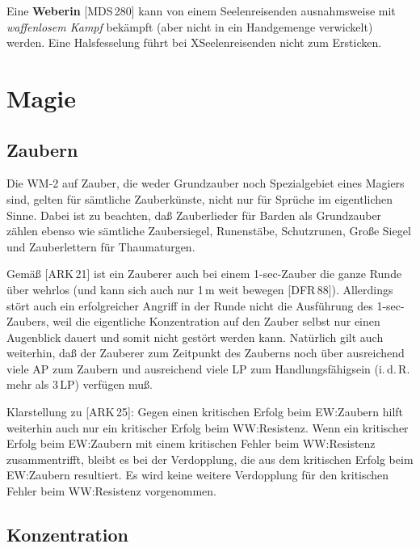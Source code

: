 \documentclass[10pt,a4paper,germanpar]{article}
\begin{document}
Eine \textbf{Weberin} [MDS\,280] kann von einem Seelenreisenden
ausnahmsweise mit \emph{waffenlosem Kampf} bekämpft (aber nicht
in ein Handgemenge verwickelt) werden. Eine Halsfesselung führt bei
XSeelenreisenden nicht zum Ersticken.

\section{Magie}

\subsection{Zaubern}

Die WM-2 auf Zauber, die weder Grundzauber noch Spezialgebiet eines Magiers
sind, gelten für sämtliche Zauberkünste, nicht nur für Sprüche im eigentlichen
Sinne. Dabei ist zu beachten, daß Zauberlieder für Barden als Grundzauber
zählen ebenso wie sämtliche Zaubersiegel, Runenstäbe, Schutzrunen, Große
Siegel und Zauberlettern für Thaumaturgen.

Gemäß [ARK\,21] ist ein Zauberer auch bei einem 1-sec-Zauber die ganze Runde
über wehrlos (und kann sich auch nur 1\,m weit bewegen [DFR\,88]). Allerdings
stört auch ein erfolgreicher Angriff in der Runde nicht die Ausführung des
1-sec-Zaubers, weil die eigentliche Konzentration auf den Zauber selbst nur
einen Augenblick dauert und somit nicht gestört werden kann. Natürlich gilt
auch weiterhin, daß der Zauberer zum Zeitpunkt des Zauberns noch über
ausreichend viele AP zum Zaubern und ausreichend viele LP zum
Handlungsfähigsein (i.\,d.\,R. mehr als 3\,LP) verfügen muß.

Klarstellung zu [ARK\,25]: Gegen einen kritischen Erfolg beim EW:Zaubern
hilft weiterhin auch nur ein kritischer Erfolg beim WW:Resistenz. Wenn
ein kritischer Erfolg beim EW:Zaubern mit einem kritischen Fehler beim
WW:Resistenz zusammentrifft, bleibt es bei der Verdopplung, die aus
dem kritischen Erfolg beim EW:Zaubern resultiert. Es wird keine
weitere Verdopplung für den kritischen Fehler beim WW:Resistenz
vorgenommen.

\subsection{Konzentration}
\end{document}
